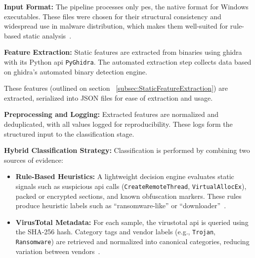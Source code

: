 \vspace{0.5em}
\noindent\textbf{Input Format:} The pipeline processes only \glspl{pe}, the native format for
Windows executables. These files were chosen for their structural consistency and widespread use in
malware distribution, which makes them well-suited for rule-based static
analysis~\cite{fedak2020fundamentals}.

\vspace{0.5em}
\noindent\textbf{Feature Extraction:} Static features are extracted from binaries using
\gls{ghidra} with its Python \gls{api} \texttt{PyGhidra}. The automated extraction
step collects data based on \gls{ghidra}'s automated binary detection engine.

These features (outlined on section ~\ref{subsec:StaticFeatureExtraction}) are extracted,
serialized into JSON files for ease of extraction and usage.

\vspace{0.5em}
\noindent\textbf{Preprocessing and Logging:} Extracted features are normalized and deduplicated,
with all values logged for reproducibility. These logs form the structured input to the
classification stage.

\vspace{0.5em}
\noindent\textbf{Hybrid Classification Strategy:} Classification is performed by combining two
sources of evidence:
\begin{itemize}
      \item \textbf{Rule-Based Heuristics:} A lightweight decision engine evaluates static signals
            such as suspicious \gls{api} calls (\texttt{CreateRemoteThread}, \texttt{VirtualAllocEx}),
            packed or encrypted sections, and known obfuscation markers. These rules produce
            heuristic labels such as ``ransomware-like'' or ``downloader''~\cite{gaber2024malware,
                  cassanova2022systematic}.
      \item \textbf{VirusTotal Metadata:} For each sample, the \gls{virustotal} \gls{api} is queried using the
            SHA-256 hash. Category tags and vendor labels (e.g., \texttt{Trojan}, \texttt{Ransomware})
            are retrieved and normalized into canonical categories, reducing variation between
            vendors~\cite{wong2021practice}.
\end{itemize}

